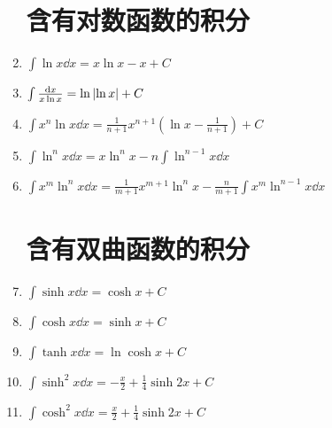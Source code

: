 \begin{enumerate}
\section*{含有对数函数的积分}
\item \(\int \ln x \dd{x} = x \ln x - x + C\)
\item \(\int \frac{\dd{x}}{x \ln x} = \ln\abs{\ln x} + C\)
\item \(\int x^n \ln x \dd{x}
= \frac{1}{n+1} x^{n+1} \left(\ln x - \frac{1}{n+1}\right) + C\)
\item \(\int \ln^n x \dd{x}
= x \ln^n x - n \int \ln^{n-1} x \dd{x}\)
\item \(\int x^m \ln^n x \dd{x}
= \frac{1}{m+1} x^{m+1} \ln^n x - \frac{n}{m+1} \int x^m \ln^{n-1} x \dd{x}\)

\section*{含有双曲函数的积分}
\item \(\int \sinh x \dd{x} = \cosh x + C\)
\item \(\int \cosh x \dd{x} = \sinh x + C\)
\item \(\int \tanh x \dd{x} = \ln\cosh x + C\)
\item \(\int \sinh^2 x \dd{x} = -\frac{x}{2} + \frac{1}{4} \sinh2x + C\)
\item \(\int \cosh^2 x \dd{x} = \frac{x}{2} + \frac{1}{4} \sinh 2x + C\)
\end{enumerate}

